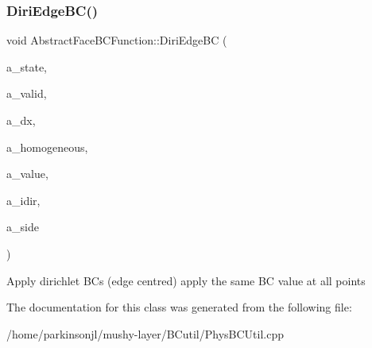 \subsubsection{\texorpdfstring{Diri\+Edge\+B\+C()}{DiriEdgeBC()}}
{\footnotesize\ttfamily void Abstract\+Face\+B\+C\+Function\+::\+Diri\+Edge\+BC (\begin{DoxyParamCaption}\item[{\textbf{ F\+Array\+Box} \&}]{a\+\_\+state,  }\item[{const \textbf{ Box} \&}]{a\+\_\+valid,  }\item[{\textbf{ Real}}]{a\+\_\+dx,  }\item[{bool}]{a\+\_\+homogeneous,  }\item[{\textbf{ B\+C\+Value\+Holder}}]{a\+\_\+value,  }\item[{int}]{a\+\_\+idir,  }\item[{\textbf{ Side\+::\+Lo\+Hi\+Side}}]{a\+\_\+side }\end{DoxyParamCaption})\hspace{0.3cm}{\ttfamily [inline]}}

Apply dirichlet B\+Cs (edge centred) apply the same BC value at all points 

The documentation for this class was generated from the following file\+:\begin{DoxyCompactItemize}
\item 
/home/parkinsonjl/mushy-\/layer/\+B\+Cutil/Phys\+B\+C\+Util.\+cpp\end{DoxyCompactItemize}
